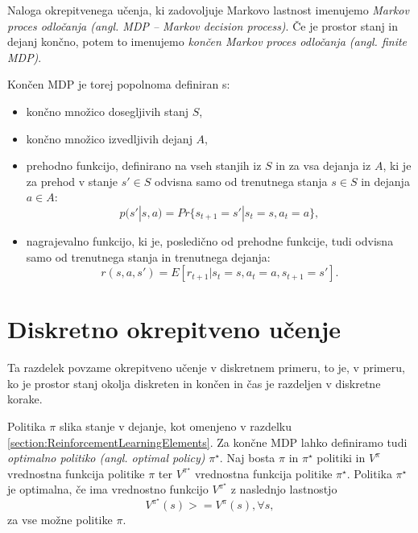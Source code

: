 \documentclass[a4paper, oneside, 12pt]{report}
\begin{document}
Naloga okrepitvenega učenja, ki zadovoljuje Markovo lastnost imenujemo {\em Markov proces odločanja (angl. MDP -- Markov decision process)}. Če je prostor stanj in dejanj končno, potem to imenujemo {\em končen Markov proces odločanja (angl. finite MDP)}.

Končen MDP je torej popolnoma definiran s:
\begin{itemize}
\item končno množico dosegljivih stanj $S$,
\item končno množico izvedljivih dejanj $A$,
\item prehodno funkcijo, definirano na vseh stanjih iz $S$ in za vsa dejanja iz $A$, ki je za prehod v stanje $s' \in S$ odvisna samo od trenutnega stanja $s \in S$ in dejanja $a \in A$: 
\begin{equation}
p(s' | s, a) = Pr\{s_{t+1} = s' | s_t = s, a_t = a\},
\end{equation}
\item nagrajevalno funkcijo, ki je, posledično od prehodne funkcije, tudi odvisna samo od trenutnega stanja in trenutnega dejanja:
\begin{equation}
r(s, a, s') = E[r_{t+1} | s_t = s, a_t = a, s_{t+1} = s'].
\end{equation}
\end{itemize}

\section{Diskretno okrepitveno učenje}
Ta razdelek povzame okrepitveno učenje \cite{ReinforcementLearningAnIntroduction} v diskretnem primeru, to je, v primeru, ko je prostor stanj okolja diskreten in končen in čas je razdeljen v diskretne korake.

Politika $\pi$ slika stanje v dejanje, kot omenjeno v razdelku \ref{section:ReinforcementLearningElements}. Za končne MDP lahko definiramo tudi {\em optimalno politiko (angl. optimal policy)} $\pi^\star$. Naj bosta $\pi$ in $\pi^\star$ politiki in $V^\pi$ vrednostna funkcija politike $\pi$ ter $V^{\pi^\star}$ vrednostna funkcija politike $\pi^\star$. Politika $\pi^\star$ je optimalna, če ima vrednostno funkcijo  $V^{\pi^\star}$ z naslednjo lastnostjo
\begin{equation}
V^{\pi^\star}(s) >= V^\pi(s), \forall s,
\end{equation}
za vse možne politike $\pi$.
\end{document}
